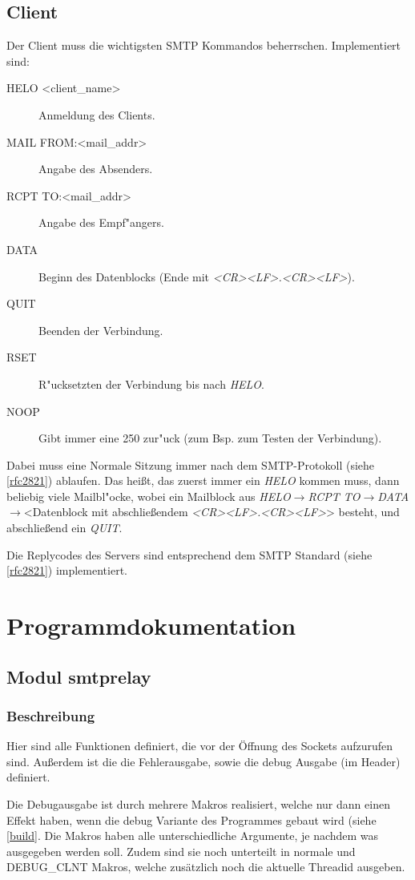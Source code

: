 \documentclass[pdftex,final,a4paper,10pt,notitlepage,halfparskip]{scrreprt}
\begin{document}
\section{Client}
Der Client muss die wichtigsten SMTP Kommandos beherrschen. Implementiert sind:
\begin{description}
  \item[HELO <client\_name>] Anmeldung des Clients.
  \item[MAIL FROM:<mail\_addr>] Angabe des Absenders.
  \item[RCPT TO:<mail\_addr>] Angabe des Empf"{a}ngers.
  \item[DATA] Beginn des Datenblocks (Ende mit \textit{<CR><LF>.<CR><LF>}).
  \item[QUIT] Beenden der Verbindung.
  \item[RSET] R"{u}cksetzten der Verbindung bis nach \textit{HELO}. 
  \item[NOOP] Gibt immer eine 250 zur"{u}ck (zum Bsp. zum Testen der Verbindung).
\end{description}

Dabei muss eine Normale Sitzung immer nach dem SMTP-Protokoll (siehe \ref{rfc2821}) ablaufen. Das heißt, das zuerst immer ein \textit{HELO} kommen muss, dann beliebig viele Mailbl"{o}cke, wobei ein Mailblock aus \textit{HELO}$\rightarrow$\textit{RCPT TO}$\rightarrow$\textit{DATA}$\rightarrow$<Datenblock mit abschließendem \textit{<CR><LF>.<CR><LF>}> besteht, und abschließend ein \textit{QUIT}.

Die Replycodes des Servers sind entsprechend dem SMTP Standard (siehe \ref{rfc2821}) implementiert.

\chapter{Programmdokumentation}
\section{Modul smtprelay}\label{mod:smtprelay}
\subsection{Beschreibung}
Hier sind alle Funktionen definiert, die vor der Öffnung des Sockets aufzurufen sind. Außerdem ist die die Fehlerausgabe, sowie die debug Ausgabe (im Header) definiert. 

Die Debugausgabe ist durch mehrere Makros realisiert, welche nur dann einen Effekt haben, wenn die debug Variante des Programmes gebaut wird (siehe \ref{build}. Die Makros haben alle unterschiedliche Argumente, je nachdem was ausgegeben werden soll. Zudem sind sie noch unterteilt in normale und DEBUG\_CLNT Makros, welche zusätzlich noch die aktuelle Threadid ausgeben.
\end{document}
